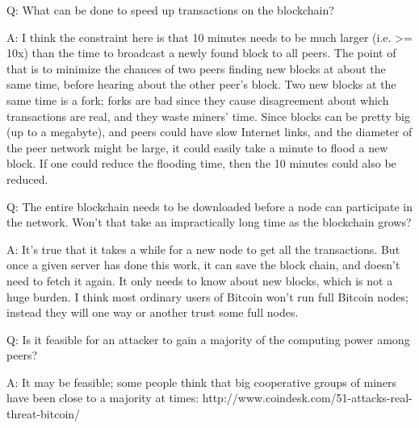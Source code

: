 \begin{frame}
Q: What can be done to speed up transactions on the blockchain?
 
A: I think the constraint here is that 10 minutes needs to be much
larger (i.e. >= 10x) than the time to broadcast a newly found block to
all peers. The point of that is to minimize the chances of two peers
finding new blocks at about the same time, before hearing about the
other peer's block. Two new blocks at the same time is a fork; forks
are bad since they cause disagreement about which transactions are
real, and they waste miners' time. Since blocks can be pretty big (up
to a megabyte), and peers could have slow Internet links, and the
diameter of the peer network might be large, it could easily take a
minute to flood a new block. If one could reduce the flooding time,
then the 10 minutes could also be reduced.
\end{frame}

\begin{frame}
Q: The entire blockchain needs to be downloaded before a node can
participate in the network. Won't that take an impractically long time
as the blockchain grows?

A: It's true that it takes a while for a new node to get all the
transactions. But once a given server has done this work, it can save
the block chain, and doesn't need to fetch it again. It only needs to
know about new blocks, which is not a huge burden. I think most
ordinary users of Bitcoin won't run full Bitcoin nodes; instead they
will one way or another trust some full nodes.
\end{frame}

\begin{frame}
Q: Is it feasible for an attacker to gain a majority of the computing
power among peers?

A: It may be feasible; some people think that big cooperative groups
of miners have been close to a majority at times:
http://www.coindesk.com/51-attacks-real-threat-bitcoin/
\end{frame}


